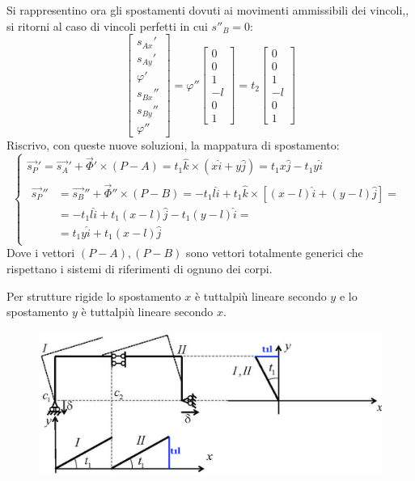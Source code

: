 \documentclass{article}
\begin{document}
\begin{adjustwidth}{2in}{}
Si rappresentino ora gli spostamenti dovuti ai movimenti ammissibili dei vincoli,, si ritorni al caso di vincoli perfetti in cui $s''_B = 0$: 
\[ 
\left[ \begin{array}{c}
	s_{Ax}' \\
	s_{Ay}' \\
	\varphi' \\
	s_{Bx}'' \\
	s_{By}'' \\
	\varphi''
\end{array}\right] = \varphi'' \left[\begin{array}{c}
0 \\
0 \\
1 \\
-l \\
0 \\
1 
\end{array} \right] = t_2 \left[\begin{array}{c}
0 \\
0 \\
1 \\
-l \\
0 \\
1 
\end{array} \right]
\]		
Riscrivo, con queste nuove soluzioni, la mappatura di spostamento: 
\[
\begin{cases}
\vec{s_P}' = \vec{s_A}' + \vec{\Phi}'\times (P-A) = t_1\hat{k} \times (x\hat{i} + y\hat{j}) = t_1x\hat{j} - t_1y\hat{i} \\
\begin{split}
\vec{s_P}'' & = \vec{s_B}'' + \vec{\Phi}''\times (P-B) = -t_1l\hat{i} + t_1\hat{k} \times [(x-l)\hat{i} + (y-l)\hat{j}] = \\
& = -t_1l\hat{i} + t_1(x-l)\hat{j} -  t_1(y-l)\hat{i} = \\
& = t_1y\hat{i} + t_1(x-l)\hat{j}
\end{split}
\end{cases}
\]
Dove i vettori $(P-A), (P-B)$ sono vettori totalmente generici che rispettano i sistemi di riferimenti di ognuno dei corpi. \newline 
		
Per strutture rigide lo spostamento $x$ è tuttalpiù lineare secondo $y$ e lo spostamento $y$ è tuttalpiù lineare secondo $x$.
\begin{figure}[H]
	\centering
	\includegraphics[width=0.3\linewidth]{immagini/1.PARTE2_Pagina_35}
\end{figure}


\end{adjustwidth}
\end{document}
